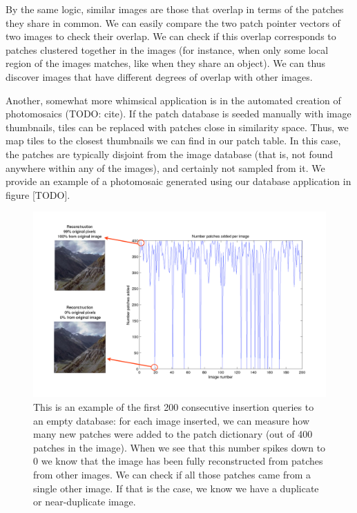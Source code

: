 By the same logic, similar images are those that overlap in terms of the patches they share in common. We can easily compare the two patch pointer vectors of two images to check their overlap. We can check if this overlap corresponds to patches clustered together in the images (for instance, when only some local region of the images matches, like when they share an object). We can thus discover images that have different degrees of overlap with other images.

\begin{edit}
Another, somewhat more whimsical application is in the automated creation of photomosaics (TODO: cite).  If the patch database is seeded manually with image thumbnails, tiles can be replaced with patches close in similarity space.  Thus, we map tiles to the closest thumbnails we can find in our patch table.  In this case, the patches are typically disjoint from the image database (that is, not found anywhere within any of the images), and certainly not sampled from it.  We provide an example of a photomosaic generated using our database application in figure [TODO].
\end{edit}

 \begin{figure}
\hspace{-8mm}
\includegraphics[width=1.2\linewidth]{Figures/dupDetection.pdf}
\caption{This is an example of the first 200 consecutive insertion queries to an empty database: for each image inserted, we can measure how many new patches were added to the patch dictionary (out of 400 patches in the image). When we see that this number spikes down to 0 we know that the image has been fully reconstructed from patches from other images. We can check if all those patches came from a single other image. If that is the case, we know we have a duplicate or near-duplicate image. }
\label{fig:dups}
\end{figure}

